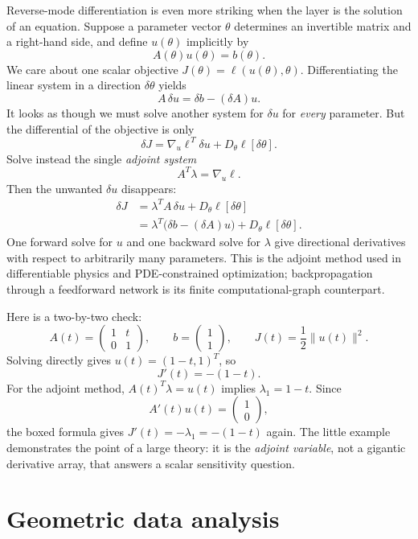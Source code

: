 Reverse-mode differentiation is even more striking when the layer is the solution of an equation. Suppose a parameter vector $\theta$ determines an invertible matrix and a right-hand side, and define $u(\theta)$ implicitly by
\[
 A(\theta)u(\theta)=b(\theta).
\]
We care about one scalar objective $J(\theta)=\ell(u(\theta),\theta)$. Differentiating the linear system in a direction $\delta\theta$ yields
\[
 A\,\delta u=\delta b-(\delta A)u.
\]
It looks as though we must solve another system for $\delta u$ for \emph{every} parameter. But the differential of the objective is only
\[
 \delta J=\nabla_u\ell^{\,T}\delta u
             +D_\theta\ell[\delta\theta].
\]
Solve instead the single \emph{adjoint system}
\[
 \boxed{A^T\lambda=\nabla_u\ell.}
\]
Then the unwanted $\delta u$ disappears:
\[
\begin{aligned}
 \delta J
 &=\lambda^T A\,\delta u+D_\theta\ell[\delta\theta]\\
 &=\boxed{\lambda^T\bigl(\delta b-(\delta A)u\bigr)
                       +D_\theta\ell[\delta\theta].}
\end{aligned}
\]
One forward solve for $u$ and one backward solve for $\lambda$ give directional derivatives with respect to arbitrarily many parameters. This is the adjoint method used in differentiable physics and PDE-constrained optimization; backpropagation through a feedforward network is its finite computational-graph counterpart.

Here is a two-by-two check:
\[
 A(t)=\begin{pmatrix}1&t\\0&1\end{pmatrix},
 \qquad b=\begin{pmatrix}1\\1\end{pmatrix},
 \qquad J(t)=\frac12\|u(t)\|^2.
\]
Solving directly gives $u(t)=(1-t,1)^T$, so
\[
 J'(t)=-(1-t).
\]
For the adjoint method, $A(t)^T\lambda=u(t)$ implies $\lambda_1=1-t$. Since
\[
 A'(t)u(t)=\begin{pmatrix}1\\0\end{pmatrix},
\]
the boxed formula gives $J'(t)=-\lambda_1=-(1-t)$ again. The little example demonstrates the point of a large theory: it is the \emph{adjoint variable}, not a gigantic derivative array, that answers a scalar sensitivity question.

\section{Geometric data analysis}

